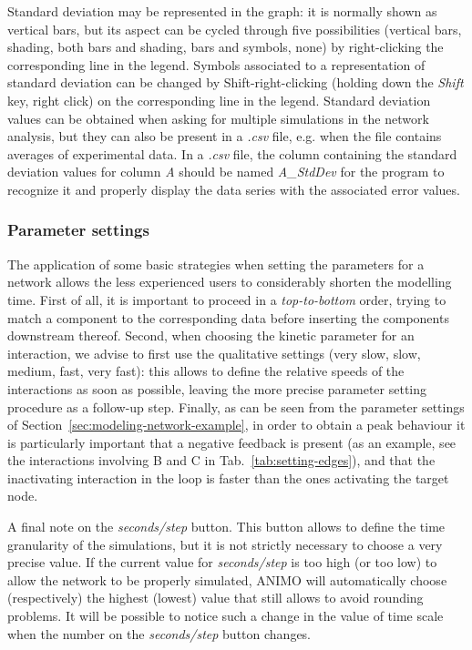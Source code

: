 Standard deviation may be represented in the graph: it is normally shown as vertical bars, but its aspect can be
cycled through five possibilities (vertical bars, shading, both bars and shading, bars and symbols, none) by right-clicking the
corresponding line in the legend. Symbols associated to a representation of standard deviation can be changed by Shift-right-clicking
(holding down the \emph{Shift} key, right click) on the corresponding line in the legend.
Standard deviation values can be obtained when asking for multiple simulations in the network
analysis, but they can also be present in a \emph{.csv} file, e.g. when the file contains averages of experimental data.
In a \emph{.csv} file, the column containing the standard deviation values for column \emph{A}
should be named \emph{A\_{}StdDev} for the program to recognize it and properly display the data series
with the associated error values.



\subsubsection{Parameter settings}
The application of some basic strategies when setting the parameters for a network allows
the less experienced users to considerably shorten the modelling time.
First of all, it is important to proceed in a \emph{top-to-bottom} order, trying to match
a component to the corresponding data before inserting the components downstream thereof.
Second, when choosing the kinetic parameter for an interaction, we advise to first use the qualitative settings (very slow, slow, medium, fast, very fast):
this allows to define the relative speeds of the interactions as soon as possible,
leaving the more precise parameter setting procedure as a follow-up step. Finally, as can be seen from
the parameter settings of Section~\ref{sec:modeling-network-example}, in order to obtain a peak
behaviour it is particularly important that
a negative feedback is present (as an example, see the interactions involving B and C in Tab.~\ref{tab:setting-edges}),
and that the inactivating interaction in the loop is faster than the ones activating the target node.

A final note on the \emph{seconds/step} button. This button allows to define the time granularity
of the simulations, but it is not strictly necessary to choose a very precise value.
If the current value for \emph{seconds/step}
is too high (or too low) to allow the network to be properly simulated, ANIMO will automatically choose (respectively)
the highest (lowest) value that still allows to avoid rounding problems. It will be possible to notice
such a change in the value of time scale when the number on the \emph{seconds/step} button changes.


